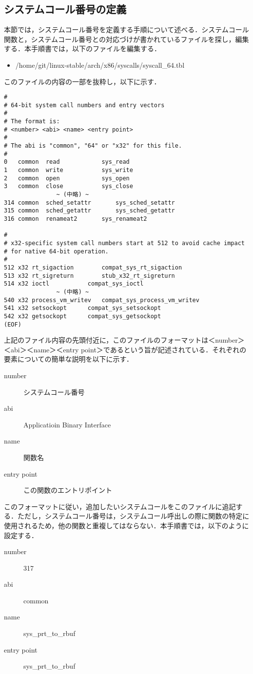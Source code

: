 \documentclass[12pt]{jsarticle}
\begin{document}
\subsection{システムコール番号の定義}
本節では，システムコール番号を定義する手順について述べる．システムコール関数と，システムコール番号との対応づけが書かれているファイルを探し，編集する．本手順書では，以下のファイルを編集する．
\begin{itemize}
\item \slash{}home\slash{}git\slash{}linux-stable\slash{}arch\slash{}x86\slash{}syscalls\slash{}syscall\_64.tbl
\end{itemize}
このファイルの内容の一部を抜粋し，以下に示す．
\begin{verbatim}
#
# 64-bit system call numbers and entry vectors
#
# The format is:
# <number> <abi> <name> <entry point>
#
# The abi is "common", "64" or "x32" for this file.
#
0	common	read			sys_read
1	common	write			sys_write
2	common	open			sys_open
3	common	close			sys_close
               ~ (中略) ~
314	common	sched_setattr		sys_sched_setattr
315	common	sched_getattr		sys_sched_getattr
316	common	renameat2		sys_renameat2

#
# x32-specific system call numbers start at 512 to avoid cache impact
# for native 64-bit operation.
#
512	x32	rt_sigaction		compat_sys_rt_sigaction
513	x32	rt_sigreturn		stub_x32_rt_sigreturn
514	x32	ioctl			compat_sys_ioctl
               ~ (中略) ~
540	x32	process_vm_writev	compat_sys_process_vm_writev
541	x32	setsockopt		compat_sys_setsockopt
542	x32	getsockopt		compat_sys_getsockopt
(EOF)
\end{verbatim}
上記のファイル内容の先頭付近に，このファイルのフォーマットは＜number＞＜abi＞＜name＞＜entry point＞であるという旨が記述されている．それぞれの要素についての簡単な説明を以下に示す．
\begin{description}
\item[number] システムコール番号
\item[abi] Applicatioin Binary Interface
\item[name] 関数名
\item[entry point] この関数のエントリポイント
\end{description}
このフォーマットに従い，追加したいシステムコールをこのファイルに追記する．ただし，システムコール番号は，システムコール呼出しの際に関数の特定に使用されるため，他の関数と重複してはならない．本手順書では，以下のように設定する．
\begin{description}
\item[number] 317
\item[abi] common
\item[name] sys\_prt\_to\_rbuf
\item[entry point] sys\_prt\_to\_rbuf 
\end{description}
\end{document}
